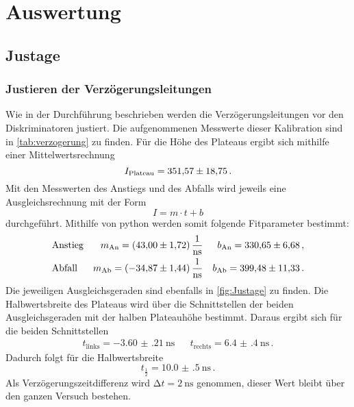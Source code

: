 \section{Auswertung}
\label{sec:Auswertung}

\subsection{Justage}
  \subsubsection{Justieren der Verzögerungsleitungen}
    Wie in der Durchführung beschrieben werden die Verzögerungsleitungen vor den Diskriminatoren justiert. 
    Die aufgenommenen Messwerte dieser Kalibration sind in \autoref{tab:verzogerung} zu finden.
    Für die Höhe des Plateaus ergibt sich mithilfe einer Mittelwertsrechnung
    \begin{equation*}
      I_\text{Plateau} = \num{351.57 \pm 18.75} \, .
    \end{equation*}
    Mit den Messwerten des Anstiegs und des Abfalls wird jeweils eine Ausgleichsrechnung mit der Form
    \begin{equation*}
      I = m \cdot t + b
    \end{equation*}
    durchgeführt.
    Mithilfe von python werden somit folgende Fitparameter bestimmt:
    \begin{align*}
      &\text{Anstieg} &m_\text{An}=\SI{43.00 \pm 1.72}{\per\nano\second}   &&b_\text{An}= \num{330.65 \pm 6.68} \, ,\\
      &\text{Abfall}  &m_\text{Ab}= \SI{-34.87 \pm 1.44}{\per\nano\second}  &&b_\text{Ab}= \num{399.48 \pm 11.33} \, .
    \end{align*}
    Die jeweiligen Ausgleichsgeraden sind ebenfalls in \autoref{fig:Justage} zu finden.
    Die Halbwertsbreite des Plateaus wird über die Schnittstellen der beiden Ausgleichsgeraden mit der halben Plateauhöhe bestimmt.
    Daraus ergibt sich für die beiden Schnittstellen
    \begin{align*}
      t_\text{links} = \SI{-3.60(21)}{\nano\second} && t_\text{rechts}= \SI{6.4(4)}{\nano\second} \, .
    \end{align*}
    Dadurch folgt für die Halbwertsbreite %
    \begin{equation*}
      t_\frac{1}{2} = \SI{10.0(5)}{\nano\second} \, .
    \end{equation*}
    Als Verzögerungszeitdifferenz wird $\increment t = \SI{2}{\nano\second}$ genommen, dieser Wert bleibt über den ganzen Versuch bestehen.
